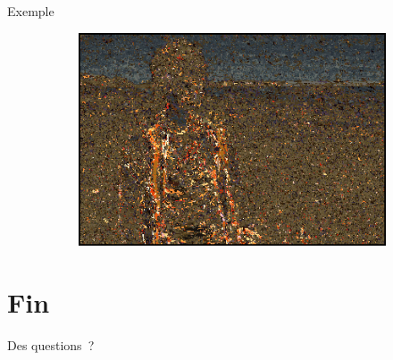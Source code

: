 \documentclass{beamer}
\begin{document}
\begin{frame}
\begin{exampleblock}{Exemple}
\begin{figure}[h]
\begin{subfigure}{0.3\textwidth}
                \caption{}
            \end{subfigure}
            \begin{subfigure}{0.3\textwidth}
                \includegraphics[width=\textwidth]{img/patchmatch_result}
                \caption{}
            \end{subfigure}
        \end{figure}
    \end{exampleblock}
\end{frame}


\section*{Fin}
\begin{frame}
    \begin{block}{}
        Des questions ?
    \end{block}
\end{frame}
\end{document}
